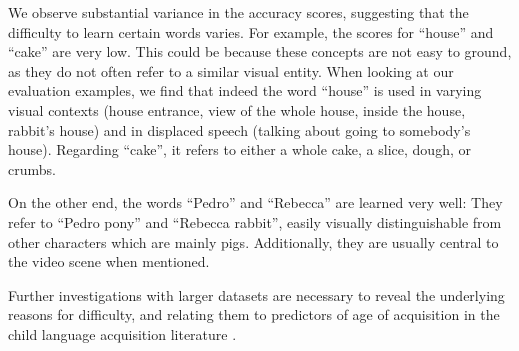 We observe substantial variance in the accuracy scores, suggesting that the 
difficulty to learn certain words varies. For example, the 
scores for ``house'' and ``cake'' are very low. This could be because these 
concepts are not easy to ground, as they do not often refer to a similar visual 
entity. When looking at our evaluation examples, we find that indeed the word 
``house'' is used in varying visual contexts (house entrance, view of the whole 
house, inside the house, rabbit's house) and in displaced speech (talking about 
going to somebody's house). Regarding ``cake'', it refers to either a whole 
cake, a slice, dough, or crumbs.

On the other end, the words ``Pedro'' and ``Rebecca'' are learned very well: 
They refer to ``Pedro pony'' and ``Rebecca rabbit'', easily visually 
distinguishable from other characters which are mainly pigs. Additionally, they 
are usually central to the video scene when mentioned.

Further investigations with larger datasets are necessary to reveal the 
underlying reasons for difficulty, and relating them to predictors of age of 
acquisition in the child language acquisition literature 
\cite{roy2015predicting,frank2021variability}. 


